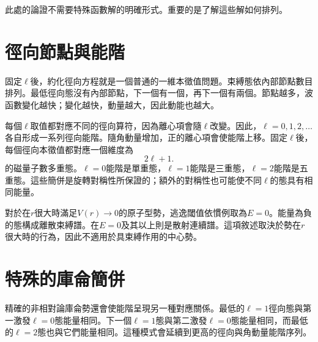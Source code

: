\begin{classroomqa}
\end{classroomqa}

此處的論證不需要特殊函數解的明確形式。重要的是了解這些解如何排列。

\section{徑向節點與能階}

固定\(\ell\)後，約化徑向方程就是一個普通的一維本徵值問題。束縛態依內部節點數目排列。最低徑向態沒有內部節點，下一個有一個，再下一個有兩個。節點越多，波函數變化越快；變化越快，動量越大，因此動能也越大。

每個\(\ell\)取值都對應不同的徑向算符，因為離心項會隨\(\ell\)改變。因此，\(\ell=0,1,2,\ldots\)各自形成一系列徑向能階。隨角動量增加，正的離心項會使能階上移。固定\(\ell\)後，每個徑向本徵值都對應一個維度為
\begin{equation}
2\ell+1.
\end{equation}
的磁量子數多重態。\(\ell=0\)能階是單重態，\(\ell=1\)能階是三重態，\(\ell=2\)能階是五重態。這些簡併是旋轉對稱性所保證的；額外的對稱性也可能使不同\(\ell\)的態具有相同能量。

對於在\(r\)很大時滿足\(V(r)\to0\)的原子型勢，逃逸閾值依慣例取為\(E=0\)。能量為負的態構成離散束縛譜。在\(E=0\)及其以上則是散射連續譜。這項敘述取決於勢在\(r\)很大時的行為，因此不適用於具束縛作用的中心勢。

\section{特殊的庫侖簡併}

精確的非相對論庫侖勢還會使能階呈現另一種對應關係。最低的\(\ell=1\)徑向態與第一激發\(\ell=0\)態能量相同。下一個\(\ell=1\)態與第二激發\(\ell=0\)態能量相同，而最低的\(\ell=2\)態也與它們能量相同。這種模式會延續到更高的徑向與角動量能階序列。

\begin{classroomqa}
\end{classroomqa}

